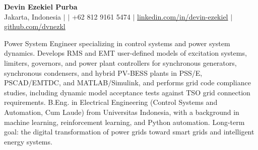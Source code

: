 \begin{center}
    {\Large \textbf{Devin Ezekiel Purba}}\\
    
    {\small Jakarta, Indonesia $|$ \href{mailto:\cvemail}{\cvemail} $|$ +62 812 9161 5474 $|$ \href{https://www.linkedin.com/in/devin-ezekiel/}{linkedin.com/in/devin-ezekiel} $|$ \href{https://github.com/dvnezkl}{github.com/dvnezkl}}\\
\end{center}

\noindent
Power System Engineer specializing in control systems and power system dynamics. Develops RMS and EMT user-defined models of excitation systems, limiters, governors, and power plant controllers for synchronous generators, synchronous condensers, and hybrid PV-BESS plants in PSS/E, PSCAD/EMTDC, and MATLAB/Simulink, and performs grid code compliance studies, including dynamic model acceptance tests against TSO grid connection requirements. B.Eng. in Electrical Engineering (Control Systems and Automation, Cum Laude) from Universitas Indonesia, with a background in machine learning, reinforcement learning, and Python automation. Long-term goal: the digital transformation of power grids toward smart grids and intelligent energy systems.
